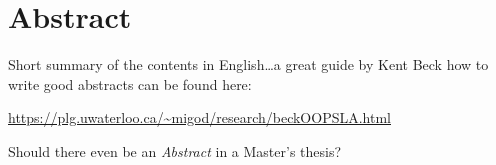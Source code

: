 \begingroup
\let\clearpage\relax
\let\cleardoublepage\relax
\let\cleardoublepage\relax

\chapter*{Abstract}
Short summary of the contents in English\dots a great guide by
Kent Beck how to write good abstracts can be found here:
\begin{center}
\url{https://plg.uwaterloo.ca/~migod/research/beckOOPSLA.html}
\end{center}
Should there even be an \textit{Abstract} in a Master's thesis?

\vfill


\endgroup

\vfill
